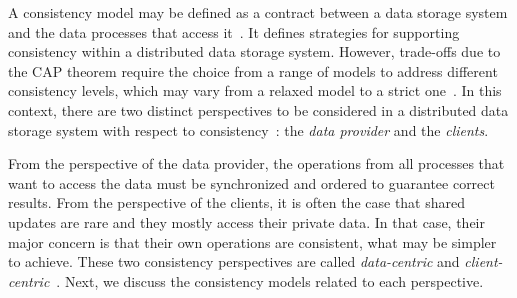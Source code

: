 

{\al A consistency model may be defined as a contract between a data storage system and the data processes that access it~\cite{tanenbaum:2007}. It defines strategies for supporting consistency within a distributed data storage system. However, trade-offs due to the CAP theorem require the choice from a range of models to address different consistency levels}, which may vary from a relaxed model to a strict one~\cite{bermbach2013consistency}. {\al In this context, there are two distinct perspectives to be considered in a distributed data storage system with respect to consistency}~\cite{tanenbaum:2007}: the \textit{data provider} and the {\al \textit{clients}}.

From the perspective of the data provider, the operations from all processes that want to access the data must be synchronized and ordered to guarantee correct results. From the perspective of the clients, it is often the case that shared updates are rare and they mostly access their private data. In that case, their major concern is that their own operations are consistent, what may be simpler to achieve.
%
These two {\al consistency perspectives} are called \textit{data-centric} and \textit{client-centric}~\cite{tanenbaum:2007}. Next, we discuss the consistency models related to each {\al perspective}.
\vspace{2mm}

